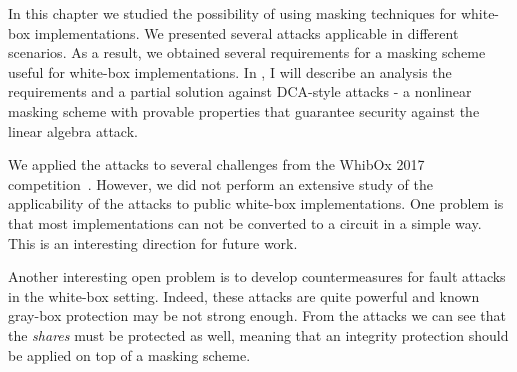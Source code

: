 
In this chapter we studied the possibility of using masking techniques for white-box implementations. We presented several attacks applicable in different scenarios. As a result, we obtained several requirements for a masking scheme useful for white-box implementations. In , I will describe an analysis the requirements and a partial solution against DCA-style attacks - a nonlinear masking scheme with provable properties that guarantee security against the linear algebra attack.

We applied the attacks to several challenges from the WhibOx 2017 competition~\cite{whibox}. However, we did not perform an extensive study of the applicability of the attacks to public white-box implementations. One problem is that most implementations can not be converted to a circuit in a simple way.
This is an interesting direction for future work.

Another interesting open problem is to develop countermeasures for fault attacks in the white-box setting. Indeed, these attacks are quite powerful and known gray-box protection may be not strong enough. From the attacks we can see that the \emph{shares} must be protected as well, meaning that an integrity protection should be applied on top of a masking scheme.

